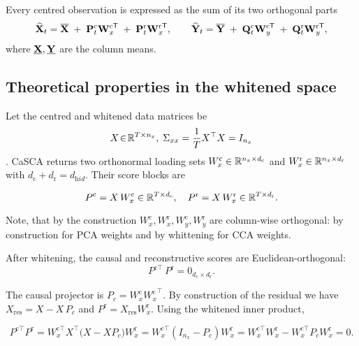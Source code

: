 \documentclass[14pt]{extarticle}
\begin{document}
	
	Every centred observation is expressed as the sum of its two
	orthogonal parts
	\[
	\widehat{\mathbf{X}}_t
	=\overline{\mathbf{X}}
	\;+\;
	\mathbf{P}_t^{\mathrm c}{\mathbf{W}_x^{\mathrm c}}^{\!\mathsf T}
	\;+\;
	\mathbf{P}_t^{\mathrm r}{\mathbf{W}_x^{\mathrm r}}^{\!\mathsf T},
	\qquad
	\widehat{\mathbf{Y}}_t
	=\overline{\mathbf{Y}}
	\;+\;
	\mathbf{Q}_t^{\mathrm c}{\mathbf{W}_y^{\mathrm c}}^{\!\mathsf T}
	\;+\;
	\mathbf{Q}_t^{\mathrm r}{\mathbf{W}_y^{\mathrm r}}^{\!\mathsf T},
	\]
	where \(\underline{\mathbf{X}},\underline{\mathbf{Y}}\) are the column means.
	
	\subsection*{Theoretical properties in the whitened space}
	Let the centred and whitened data matrices be
	\[
	X\!\in\!\mathbb{R}^{T\times n_x},\;
	\Sigma_{xx}=\frac{1}{T}X^{\top}X = I_{n_x}
	\].
	CaSCA returns two orthonormal loading sets  
	\(W_x^{\mathrm c}\in\mathbb{R}^{n_x\times d_{\mathrm c}}\)  
	and \(W_x^{\mathrm r}\in\mathbb{R}^{n_x\times d_{\mathrm r}}\)
	with \(d_{\mathrm c}+d_{\mathrm r}=d_{\mathrm hid}\).
	Their score blocks are
	
	\[
	P^{\mathrm c}=X\,W_x^{\mathrm c}\in\mathbb{R}^{T\times d_{\mathrm c}},
	\quad
	P^{\mathrm r}=X\,W_x^{\mathrm r}\in\mathbb{R}^{T\times d_{\mathrm r}}.
	\]
	
	Note, that by the construction $W_x^{\mathrm c}, W_x^{\mathrm r}, W_y^{\mathrm c}, W_y^{\mathrm r}$ are column-wise orthogonal: by construction for PCA weights and by whittening for CCA weights.
	
	\begin{lemma}\label{lem:score_orth}
		After whitening, the causal and reconstructive scores are Euclidean-orthogonal:
		\[
		P^{\mathrm c\!\top}\,P^{\mathrm r}=0_{d_{\mathrm c}\times d_{\mathrm r}}.
		\]
	\end{lemma}
	
	\begin{Proof}
		The causal projector is \(P_c=W_x^{\mathrm c}{W_x^{\mathrm c}}^{\!\top}\).
		By construction of the residual we have  
		\(X_{\mathrm{res}} = X - X\,P_c\) and
		\(P^{\mathrm r}=X_{\mathrm{res}}W_x^{\mathrm r}\).
		Using the whitened inner product,
		
		\[
		\!P^{\mathrm c\!\top}P^{\mathrm r}
		= W_x^{\mathrm c\!\top}X^{\top}\bigl(X-XP_c\bigr)W_x^{\mathrm r}
		= W_x^{\mathrm c\!\top}(I_{n_x}-P_c)W_x^{\mathrm r}
		= W_x^{\mathrm c\!\top}W_x^{\mathrm r}-W_x^{\mathrm c\!\top}P_cW_x^{\mathrm r}
		= 0.
		\]
	\end{Proof}
	
\end{document}
